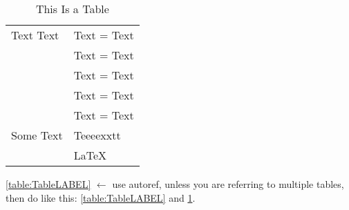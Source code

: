 \begin{table}[H]
\begin{tabular}{|l|p{5cm}|l|l|l|}
  \hline %
  \multicolumn{2}{|l|}{Text Text}    & \multicolumn{3}{l|}{Text = Text}                    \\
  \multicolumn{2}{|l|}{}             & \multicolumn{3}{l|}{Text = Text}                    \\
  \multicolumn{2}{|l|}{}             & \multicolumn{3}{l|}{Text = Text}                    \\
  \multicolumn{2}{|l|}{}             & \multicolumn{3}{l|}{Text = Text}                    \\
  \multicolumn{2}{|l|}{}             & \multicolumn{3}{l|}{Text = Text}                    \\
  \hline %
  \multicolumn{2}{|l|}{Some Text}    & \multicolumn{3}{l|}{Teeeexxtt}                      \\
  \multicolumn{2}{|l|}{}             & \multicolumn{3}{l|}{\LaTeX}                         \\
  \hline %
\end{tabular}
\caption{This Is a Table\label{table:TableLABEL}}
\end{table}

\autoref{table:TableLABEL} $\leftarrow$ use autoref, unless you are referring to multiple tables, then do like this: \autoref{table:TableLABEL} and \ref{table:TableLABEL}.

\pagebreak